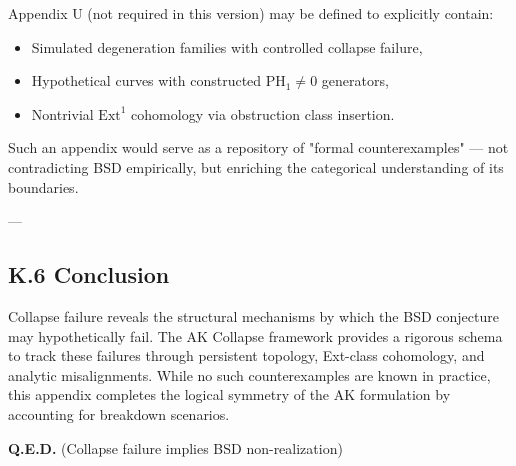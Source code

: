 \documentclass[11pt]{article}
\begin{document}
Appendix U (not required in this version) may be defined to explicitly contain:
\begin{itemize}
  \item Simulated degeneration families with controlled collapse failure,
  \item Hypothetical curves with constructed $\mathrm{PH}_1 \neq 0$ generators,
  \item Nontrivial $\mathrm{Ext}^1$ cohomology via obstruction class insertion.
\end{itemize}

Such an appendix would serve as a repository of "formal counterexamples" — not contradicting BSD empirically, but enriching the categorical understanding of its boundaries.

---

\subsection*{K.6 Conclusion}

Collapse failure reveals the structural mechanisms by which the BSD conjecture may hypothetically fail. The AK Collapse framework provides a rigorous schema to track these failures through persistent topology, Ext-class cohomology, and analytic misalignments. While no such counterexamples are known in practice, this appendix completes the logical symmetry of the AK formulation by accounting for breakdown scenarios.

\begin{center}
\textbf{Q.E.D.} (Collapse failure implies BSD non-realization)
\end{center}
\end{document}

